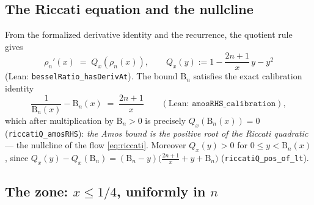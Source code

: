 \documentclass[11pt]{article}
\newcommand{\lean}[1]{\texttt{#1}}
\newcommand{\RHS}{\mathrm{B}}
\begin{document}
\subsection{The Riccati equation and the nullcline}
\label{sec:riccati}

From the formalized derivative identity and the recurrence, the
quotient rule gives
\begin{equation}\label{eq:riccati}
\rho_n'(x) \;=\; Q_x(\rho_n(x)), \qquad
Q_x(y) := 1 - \frac{2n+1}{x}\,y - y^2
\end{equation}
(Lean: \lean{besselRatio\_hasDerivAt}).
The bound $\RHS_n$ satisfies the exact calibration identity
\begin{equation}\label{eq:calibration}
\frac{1}{\RHS_n(x)} - \RHS_n(x) \;=\; \frac{2n+1}{x}
\qquad (\text{Lean: } \lean{amosRHS\_calibration}),
\end{equation}
which after multiplication by $\RHS_n > 0$ is precisely
$Q_x(\RHS_n(x)) = 0$ (\lean{riccatiQ\_amosRHS}): \emph{the Amos
bound is the positive root of the Riccati quadratic} --- the
nullcline of the flow \eqref{eq:riccati}.  Moreover $Q_x(y) > 0$ for
$0 \le y < \RHS_n(x)$, since $Q_x(y) - Q_x(\RHS_n) =
(\RHS_n - y)\bigl(\tfrac{2n+1}{x} + y + \RHS_n\bigr)$
(\lean{riccatiQ\_pos\_of\_lt}).

\subsection{The zone: $x \le 1/4$, uniformly in $n$}\label{sec:zone}
\end{document}
